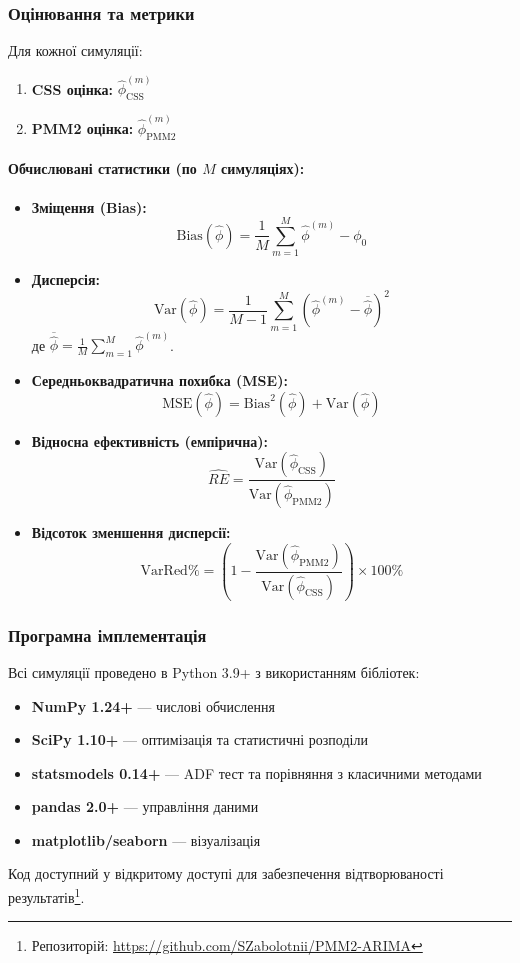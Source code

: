 \subsubsection{Оцінювання та метрики}
\label{subsubsec:estimation_metrics}

Для кожної симуляції:
\begin{enumerate}
    \item \textbf{CSS оцінка:} $\hat{\phi}_{\text{CSS}}^{(m)}$
    \item \textbf{PMM2 оцінка:} $\hat{\phi}_{\text{PMM2}}^{(m)}$
\end{enumerate}

\paragraph{Обчислювані статистики (по $M$ симуляціях):}

\begin{itemize}
    \item \textbf{Зміщення (Bias):}
    $$\text{Bias}(\hat{\phi}) = \frac{1}{M}\sum_{m=1}^{M} \hat{\phi}^{(m)} - \phi_0$$

    \item \textbf{Дисперсія:}
    $$\text{Var}(\hat{\phi}) = \frac{1}{M-1}\sum_{m=1}^{M} \left(\hat{\phi}^{(m)} - \overline{\hat{\phi}}\right)^2$$
    де $\overline{\hat{\phi}} = \frac{1}{M}\sum_{m=1}^{M} \hat{\phi}^{(m)}$.

    \item \textbf{Середньоквадратична похибка (MSE):}
    $$\text{MSE}(\hat{\phi}) = \text{Bias}^2(\hat{\phi}) + \text{Var}(\hat{\phi})$$

    \item \textbf{Відносна ефективність (емпірична):}
    $$\widehat{RE} = \frac{\text{Var}(\hat{\phi}_{\text{CSS}})}{\text{Var}(\hat{\phi}_{\text{PMM2}})}$$

    \item \textbf{Відсоток зменшення дисперсії:}
    $$\text{VarRed\%} = \left(1 - \frac{\text{Var}(\hat{\phi}_{\text{PMM2}})}{\text{Var}(\hat{\phi}_{\text{CSS}})}\right) \times 100\%$$
\end{itemize}

\subsubsection{Програмна імплементація}
\label{subsubsec:software_implementation}

Всі симуляції проведено в Python 3.9+ з використанням бібліотек:
\begin{itemize}
    \item \textbf{NumPy 1.24+} --- числові обчислення
    \item \textbf{SciPy 1.10+} --- оптимізація та статистичні розподіли
    \item \textbf{statsmodels 0.14+} --- ADF тест та порівняння з класичними методами
    \item \textbf{pandas 2.0+} --- управління даними
    \item \textbf{matplotlib/seaborn} --- візуалізація
\end{itemize}

Код доступний у відкритому доступі для забезпечення відтворюваності результатів\footnote{Репозиторій: \url{https://github.com/SZabolotnii/PMM2-ARIMA}}.

